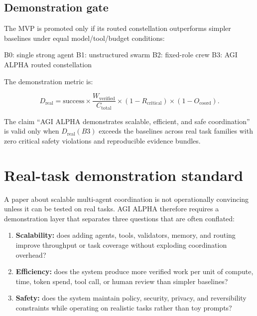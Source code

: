 \documentclass[
  11pt,
]{article}
\newenvironment{Shaded}{}{}
\newcommand{\NormalTok}[1]{#1}
\providecommand{\tightlist}{%
  \setlength{\itemsep}{0pt}\setlength{\parskip}{0pt}}
\begin{document}
\subsection{Demonstration gate}\label{demonstration-gate}

The MVP is promoted only if its routed constellation outperforms simpler
baselines under equal model/tool/budget conditions:

\begin{Shaded}
\begin{Highlighting}[]
\NormalTok{B0: single strong agent}
\NormalTok{B1: unstructured swarm}
\NormalTok{B2: fixed{-}role crew}
\NormalTok{B3: AGI ALPHA routed constellation}
\end{Highlighting}
\end{Shaded}

The demonstration metric is:

\[
D_{\mathrm{real}}
=
\mathrm{success}\times\frac{W_{\mathrm{verified}}}{C_{\mathrm{total}}}
\times(1-R_{\mathrm{critical}})
\times(1-O_{\mathrm{coord}}).
\]

The claim ``AGI ALPHA demonstrates scalable, efficient, and safe
coordination'' is valid only when \(D_{\mathrm{real}}(B3)\) exceeds the
baselines across real task families with zero critical safety violations
and reproducible evidence bundles.

\section{Real-task demonstration
standard}\label{real-task-demonstration-standard}

A paper about scalable multi-agent coordination is not operationally
convincing unless it can be tested on real tasks. AGI ALPHA therefore
requires a demonstration layer that separates three questions that are
often conflated:

\begin{enumerate}
\def\labelenumi{\arabic{enumi}.}
\tightlist
\item
  \textbf{Scalability:} does adding agents, tools, validators, memory,
  and routing improve throughput or task coverage without exploding
  coordination overhead?
\item
  \textbf{Efficiency:} does the system produce more verified work per
  unit of compute, time, token spend, tool call, or human review than
  simpler baselines?
\item
  \textbf{Safety:} does the system maintain policy, security, privacy,
  and reversibility constraints while operating on realistic tasks
  rather than toy prompts?
\end{enumerate}
\end{document}
